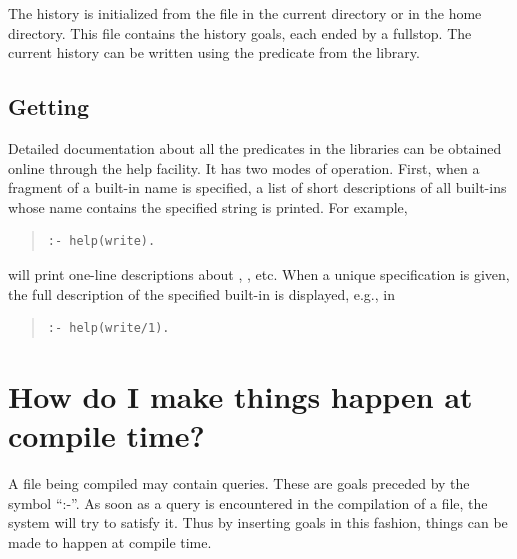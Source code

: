 The history is initialized from the file 
in the current directory or in the home directory.
This file contains the history goals, each ended by a fullstop.
The current history can be written using the predicate
 from the
 library.

\subsection{Getting }
Detailed documentation about all the predicates in the {\eclipse} libraries
can be obtained online through the help facility.
It has two modes of operation.
First, when a fragment of a built-in name is specified, a list of short
descriptions of all built-ins whose name contains the specified string
is printed.
For example,
\begin{quote}
\begin{verbatim}
:- help(write).
\end{verbatim}
\end{quote}
will print one-line descriptions about ,
, etc.
When a unique specification is given, the full description of the
specified built-in is displayed, e.g., in
\begin{quote}
\begin{verbatim}
:- help(write/1).
\end{verbatim}
\end{quote}

\section{How do I make things happen at compile time?}

A file being compiled may contain queries.
These are goals preceded by the symbol ``:-''.
As soon as a query is encountered in the compilation of a file,
the {\eclipse} system will try to satisfy it.
Thus by inserting goals in this fashion, things can be made to happen at
compile time.

